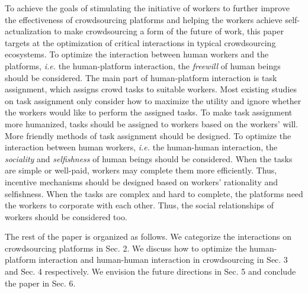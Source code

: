 \documentclass[11pt]{article}
\newcommand{\ie}{\textit{i.e.}\xspace}
\begin{document}
To achieve the goals of stimulating the initiative of workers to further improve the effectiveness of crowdsourcing platforms and helping the workers achieve self-actualization to make crowdsourcing a form of the future of work, this paper targets at the optimization of critical interactions in typical crowdsourcing ecosystems.
To optimize the interaction between human workers and the platforms, \ie the human-platform interaction, the \textit{freewill} of human beings should be considered.
The main part of human-platform interaction is task assignment, which assigns crowd tasks to suitable workers.
Most existing studies on task assignment only consider how to maximize the utility and ignore whether the workers would like to perform the assigned tasks.
To make task assignment more humanized, tasks should be assigned to workers based on the workers' will.
More friendly methods of task assignment should be designed.
To optimize the interaction between human workers, \ie the human-human interaction, the \textit{sociality} and \textit{selfishness} of human beings should be considered.
When the tasks are simple or well-paid, workers may complete them more efficiently.
Thus, incentive mechanisms should be designed based on workers' rationality and selfishness.
When the tasks are complex and hard to complete, the platforms need the workers to corporate with each other.
Thus, the social relationships of workers should be considered too.

The rest of the paper is organized as follows.
We categorize the interactions on crowdsourcing platforms in Sec. 2.
We discuss how to optimize the human-platform interaction and human-human interaction in crowdsourcing in Sec. 3 and Sec. 4 respectively.
We envision the future directions in Sec. 5 and conclude the paper in Sec. 6.
\end{document}
